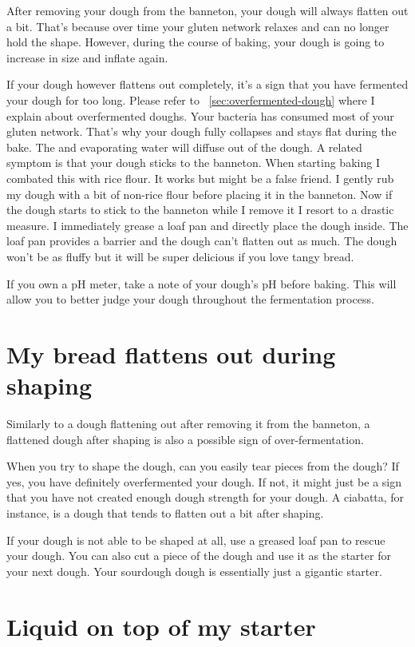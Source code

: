 After removing your dough from the banneton, your dough will always
flatten out a bit. That's because over time your gluten network
relaxes and can no longer hold the shape. However, during the course
of baking, your dough is going to increase in size and inflate again.

If your dough however flattens out completely, it's a sign that
you have fermented your dough for too long. Please refer to ~\ref{sec:overfermented-dough}
where I explain about overfermented doughs. Your bacteria
has consumed most of your gluten network. That's why your
dough fully collapses and stays flat during the bake. The
 and evaporating water will diffuse out of the dough.
A related symptom is that your dough sticks to the banneton.
When starting baking I combated this with rice flour.
It works but might be a false friend. I gently rub my
dough with a bit of non-rice flour before placing it in
the banneton. Now if the dough starts to stick to the banneton
while I remove it I resort to a drastic measure. I immediately
grease a loaf pan and directly place the dough inside. The loaf
pan provides a barrier and the dough can't flatten out as much.
The dough won't be as fluffy but it will be super delicious if you love tangy bread.

If you own a pH meter, take a note of your dough's pH before baking.
This will allow you to better judge your dough throughout
the fermentation process.

\section{My bread flattens out during shaping}

Similarly to a dough flattening out after removing it from the banneton,
a flattened dough after shaping is also a possible sign of over-fermentation.

When you try to shape the dough, can you easily tear pieces from the dough?
If yes, you have definitely overfermented your dough. If not, it might just
be a sign that you have not created enough dough strength for your dough.
A ciabatta, for instance, is a dough that tends to flatten out a bit after shaping.

If your dough is not able to be shaped at all, use a greased loaf pan
to rescue your dough. You can also cut a piece of the dough and use it
as the starter for your next dough. Your sourdough dough is essentially
just a gigantic starter.

\section{Liquid on top of my starter}

